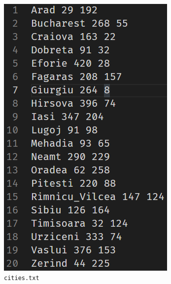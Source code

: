 \documentclass[a4paper, 11pt]{article}
\begin{document}
\begin{figure}[h]
  \centering\
  \begin{subfigure}[b]{0.3\textwidth}
    \centering
    \includegraphics[width=\textwidth,height=\textheight,keepaspectratio]{cities.png}
    \caption{\lstinline|cities.txt| }
  \end{subfigure}
  \hfill
  \begin{subfigure}[b]{0.3\textwidth}
    \centering

\end{subfigure}
\end{figure}
\end{document}

